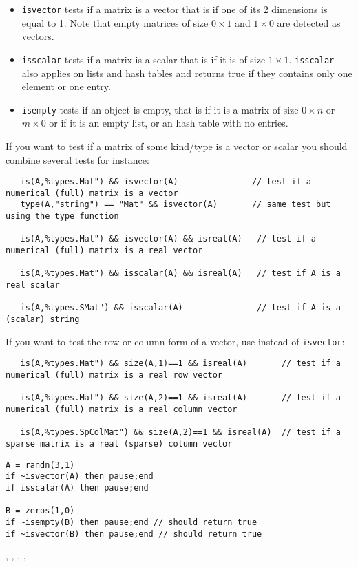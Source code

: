 \begin{mandescription}
\begin{itemize}
\item \verb+isvector+ tests if a matrix is a vector that is if one of its 2 dimensions is equal to 1. 
      Note that empty matrices of size $0 \times 1$ and $1 \times 0$ are detected as vectors.
\item \verb+isscalar+ tests if a matrix is a scalar that is if it is of size $1 \times 1$.
      \verb+isscalar+ also applies on lists and hash tables and returns true if they contains only
      one element or one entry.
\item \verb+isempty+ tests if an object is empty, that is if it is a matrix of size $0 \times n$ or $m \times 0$ or
      if it is an empty list, or an hash table with no entries.
\end{itemize}

If you want to test if a matrix of some kind/type is a vector or scalar you should combine
several tests for instance:
\begin{verbatim}
   is(A,%types.Mat") && isvector(A)               // test if a numerical (full) matrix is a vector
   type(A,"string") == "Mat" && isvector(A)       // same test but using the type function

   is(A,%types.Mat") && isvector(A) && isreal(A)   // test if a numerical (full) matrix is a real vector

   is(A,%types.Mat") && isscalar(A) && isreal(A)   // test if A is a real scalar

   is(A,%types.SMat") && isscalar(A)               // test if A is a (scalar) string
\end{verbatim}

If you want to test the row or column form of a vector, use  instead of \verb+isvector+:
\begin{verbatim}
   is(A,%types.Mat") && size(A,1)==1 && isreal(A)       // test if a numerical (full) matrix is a real row vector

   is(A,%types.Mat") && size(A,2)==1 && isreal(A)       // test if a numerical (full) matrix is a real column vector

   is(A,%types.SpColMat") && size(A,2)==1 && isreal(A)  // test if a sparse matrix is a real (sparse) column vector
\end{verbatim}
\end{mandescription}

\begin{examples}
\begin{Verbatim}
A = randn(3,1)
if ~isvector(A) then pause;end
if isscalar(A) then pause;end

B = zeros(1,0)
if ~isempty(B) then pause;end // should return true
if ~isvector(B) then pause;end // should return true
\end{Verbatim}
\end{examples}

\begin{manseealso}
   , , , ,  
\end{manseealso}

